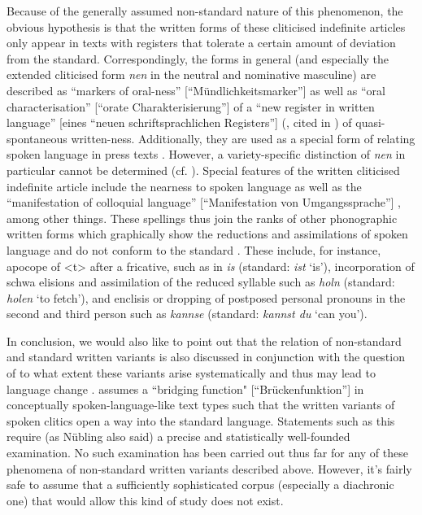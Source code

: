 Because of the generally assumed non-standard nature of this phenomenon, the obvious hypothesis is that the written forms of these cliticised indefinite articles only appear in texts with registers that tolerate a certain amount of deviation from the standard.
Correspondingly, the forms in general (and especially the extended cliticised form \textit{nen} in the neutral and nominative masculine) are described as ``markers of oral-ness'' [``Mündlichkeitsmarker''] \citep{Ziegler2011,Ziegler2012} as well as ``oral characterisation'' [``orate Charakterisierung''] \citep[171]{Tophinke2002} of a ``new register in written language'' [eines ``neuen schriftsprachlichen Registers''] (\citealt{Weingarten1997}, cited in \citealt[3]{Burri2003}) of quasi-spontaneous written-ness.
Additionally, they are used as a special form of relating spoken language in press texts \citep{Ziegler2012}.
However, a variety-specific distinction of \textit{nen} in particular cannot be determined (cf. \citealt[183]{Vogel2006}).
Special features of the written cliticised indefinite article include the nearness to spoken language as well as the ``manifestation of colloquial language'' [``Manifestation von Umgangssprache''] \citep[4]{Burri2003}, among other things.
These spellings thus join the ranks of other phonographic written forms which graphically show the reductions and assimilations of spoken language and do not conform to the standard \citep{Burri2003,Tophinke2002,SchusterTophinke2012}.
These include, for instance, apocope of <t> after a fricative, such as in \textit{is} (standard: \textit{ist} `is'), incorporation of schwa elisions and assimilation of the reduced syllable such as \textit{holn} (standard: \textit{holen} `to fetch'), and enclisis or dropping of postposed personal pronouns in the second and third person such as \textit{kannse} (standard: \textit{kannst du} `can you').

In conclusion, we would also like to point out that the relation of non-standard and standard written variants is also discussed in conjunction with the question of to what extent these variants arise systematically and thus may lead to language change \citep{HaaseEa1997,Naumann1998,Burri2003,SchusterTophinke2012}.
\citet[307]{Nuebling1992} assumes a ``bridging function" [``Brückenfunktion''] in conceptually spoken-language-like text types such that the written variants of spoken clitics open a way into the standard language.
Statements such as this require (as Nübling also said) a precise and statistically well-founded examination.
No such examination has been carried out thus far for any of these phenomena of non-standard written variants described above.
However, it's fairly safe to assume that a sufficiently sophisticated corpus (especially a diachronic one) that would allow this kind of study does not exist.

